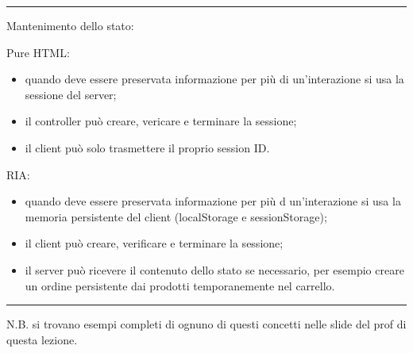 \rule{\textwidth}{0,4pt}
Mantenimento dello stato:
\begin{multicols}{2}
Pure HTML:
\begin{itemize}
    \item quando deve essere preservata informazione per più di un'interazione si usa la sessione del server;
    \item il controller può creare, vericare e terminare la sessione;
    \item il client può solo trasmettere il proprio session ID.
\end{itemize}
\vfill\null
\columnbreak
RIA:
\begin{itemize}
    \item quando deve essere preservata informazione per più d un'interazione si usa la memoria persistente del client (localStorage e sessionStorage);
    \item il client può creare, verificare e terminare la sessione;
    \item il server può ricevere il contenuto dello stato se necessario, per esempio creare un ordine persistente dai prodotti temporanemente nel carrello.
\end{itemize}
\end{multicols}
\rule{\textwidth}{0,4pt}
N.B. si trovano esempi completi di ognuno di questi concetti nelle slide del prof di questa lezione.
